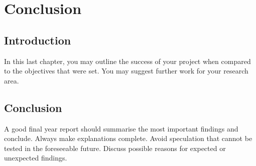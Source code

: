 \chapter{Conclusion}
\section{Introduction}

In this last chapter, you may outline the success of your project when 
compared to the objectives that were set. You may suggest further work for your research area.

\section{Conclusion}

A good final year report should summarise the most important findings and conclude. Always make explanations complete. Avoid speculation that cannot be tested in the foreseeable future. Discuss possible reasons for 
expected or unexpected findings. 